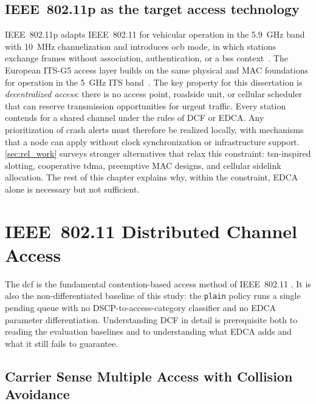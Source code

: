 \subsection{IEEE~802.11p as the target access technology}
\label{sec:bg:11p-position}

IEEE~802.11p adapts IEEE~802.11 for vehicular operation in the \SI{5.9}{\giga\hertz} band with \SI{10}{\mega\hertz} channelization and introduces \gls{ocb} mode, in which stations exchange frames without association, authentication, or a \gls{bss} context~\cite{jiang2008ieee80211p,IEEE80211}.
The European ITS-G5 access layer builds on the same physical and MAC foundations for operation in the \SI{5}{\giga\hertz} ITS band~\cite{etsi_en_302663}.
The key property for this dissertation is \emph{decentralized access}: there is no access point, roadside unit, or cellular scheduler that can reserve transmission opportunities for urgent traffic.
Every station contends for a shared channel under the rules of DCF or EDCA.
Any prioritization of crash alerts must therefore be realized locally, with mechanisms that a node can apply without clock synchronization or infrastructure support.
\autoref{sec:rel_work} surveys stronger alternatives that relax this constraint: \gls{tsn}-inspired slotting, cooperative \gls{tdma}, preemptive MAC designs, and cellular sidelink allocation.
The rest of this chapter explains why, within the constraint, EDCA alone is necessary but not sufficient.

\section{IEEE~802.11 Distributed Channel Access}
\label{sec:bg:dcf}

The \gls{dcf} is the fundamental contention-based access method of IEEE~802.11 \cite{IEEE80211}.
It is also the non-differentiated baseline of this study: the \texttt{plain} policy runs a single pending queue with no DSCP-to-access-category classifier and no EDCA parameter differentiation.
Understanding DCF in detail is prerequisite both to reading the evaluation baselines and to understanding what EDCA adds and what it still fails to guarantee.

\subsection{Carrier Sense Multiple Access with Collision Avoidance}
\label{sec:bg:csma}

